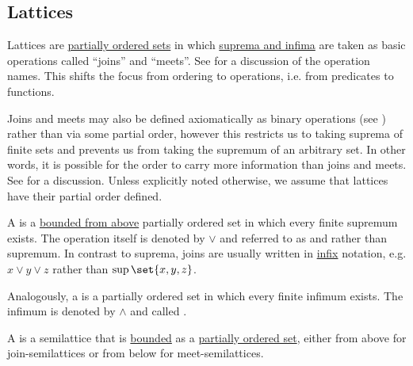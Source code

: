 \subsection{Lattices}\label{subsec:lattices}

\begin{definition}\label{def:semilattice}
  Lattices are \hyperref[def:partially_ordered_set]{partially ordered sets} in which \hyperref[def:partially_ordered_set_extremal_points/supremum_and_infimum]{suprema and infima} are taken as basic operations called \enquote{joins} and \enquote{meets}. See  for a discussion of the operation names. This shifts the focus from ordering to operations, i.e. from predicates to functions.

  Joins and meets may also be defined axiomatically as binary operations (see ) rather than via some partial order, however this restricts us to taking suprema of finite sets and prevents us from taking the supremum of an arbitrary set. In other words, it is possible for the order to carry more information than joins and meets. See  for a discussion. Unless explicitly noted otherwise, we assume that lattices have their partial order defined.

  \begin{thmenum}[series=def:semilattice]
     A  is a \hyperref[def:partially_ordered_set_extremal_points/top_and_bottom]{bounded from above} partially ordered set in which every finite supremum exists. The operation itself is denoted by \( \vee \) and referred to as  and rather than supremum. In contrast to suprema, joins are usually written in \hyperref[rem:first_order_formula_conventions/infix]{infix} notation, e.g. \( x \vee y \vee z \) rather than \( \sup\set{ x, y, z } \).

     Analogously, a  is a partially ordered set in which every finite infimum exists. The infimum is denoted by \( \wedge \) and called .

     A  is a semilattice that is \hyperref[def:partially_ordered_set_extremal_points/top_and_bottom]{bounded} as a \hyperref[def:partially_ordered_set]{partially ordered set}, either from above for join-semilattices or from below for meet-semilattices.


\end{thmenum}
\end{definition}
